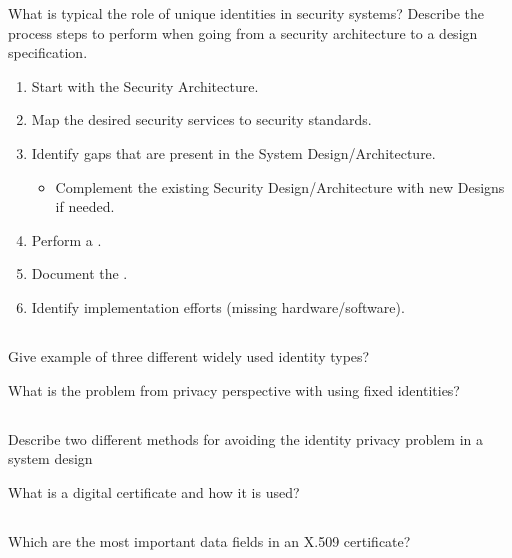 \begin{questions}
\question{} What is typical the role of unique identities in security systems?
\question{} Describe the process steps to perform when going from a security architecture to a design specification.
  \begin{solution}
    \begin{enumerate}[noitemsep]
    \item Start with the Security Architecture.
    \item Map the desired security services to security standards.
    \item Identify gaps that are present in the System Design/Architecture.
      \begin{itemize}[noitemsep]
      \item Complement the existing Security Design/Architecture with new Designs if needed.
      \end{itemize}
    \item Perform a .
    \item Document the .
    \item Identify implementation efforts (missing hardware/software).
    \end{enumerate}
  \end{solution}

  \begin{parts}
  \part{} Give example of three different widely used identity types?
  \end{parts}

\question{} What is the problem from privacy perspective with using fixed identities?
  \begin{parts}
  \part{} Describe two different methods for avoiding the identity privacy problem in a system design
  \end{parts}

\question{} What is a digital certificate and how it is used?
  \begin{parts}
  \part{} Which are the most important data fields in an X.509 certificate?
  \end{parts}


\end{questions}
